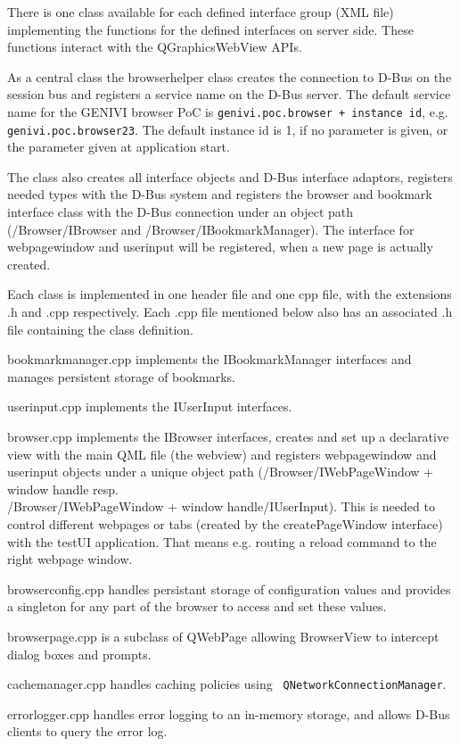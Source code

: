 \documentclass{pelagicore}
\begin{document}
There is one class available for each defined interface group (XML file)
implementing the functions for the defined interfaces on server side. These
functions interact with the QGraphicsWebView APIs.

As a central class the browserhelper class creates the connection to D-Bus on
the session bus and registers a service name on the D-Bus server. The default
service name for the GENIVI browser PoC is {\tt genivi.poc.browser + instance
id}, e.g. {\tt genivi.poc.browser23}. The default instance id is 1, if no
parameter is given, or the parameter given at application start.

The class also creates all interface objects and D-Bus interface adaptors,
registers needed types with the D-Bus system and registers the browser and
bookmark interface class with the D-Bus connection under an object path
(/Browser/IBrowser and /Browser/IBookmarkManager). The interface for
webpagewindow and userinput will be registered, when a new page is actually
created.

Each class is implemented in one header file and one cpp file, with the
extensions .h and .cpp respectively. Each .cpp file mentioned below also has an
associated .h file containing the class definition.

bookmarkmanager.cpp implements the IBookmarkManager interfaces and manages
persistent storage of bookmarks.

userinput.cpp implements the IUserInput interfaces.

browser.cpp implements the IBrowser interfaces, creates and set up a
declarative view with the main QML file (the webview) and registers
webpagewindow and userinput objects under a unique object path
(/Browser/IWebPageWindow + window handle resp. \\/Browser/IWebPageWindow + window
handle/IUserInput). This is needed to control different webpages or tabs
(created by the createPageWindow interface) with the testUI application. That
means e.g. routing a reload command to the right webpage window.

browserconfig.cpp handles persistant storage of configuration values and
provides a singleton for any part of the browser to access and set these
values.

browserpage.cpp is a subclass of QWebPage allowing BrowserView to intercept
dialog boxes and prompts.

cachemanager.cpp handles caching policies using {\tt
QNetworkConnectionManager}.

errorlogger.cpp handles error logging to an in-memory storage, and allows
D-Bus clients to query the error log.
\end{document}
